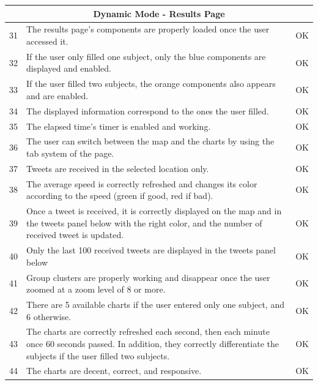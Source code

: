\documentclass[a4paper,11pt]{report}
\begin{document}
\begin{center}
\begin{longtable}{|l|p{10cm}|p{4.4cm}|}
	\multicolumn{3}{|c|}{\textbf{Dynamic Mode - Results Page}}\\\hline	
	31 & The results page's components are properly loaded once the user accessed it. & \color{ForestGreen}OK\color{black}\\\hline
	32 & If the user only filled one subject, only the blue components are displayed and enabled. & \color{ForestGreen}OK\color{black}\\\hline
	33 & If the user filled two subjects, the orange components also appears and are enabled. & \color{ForestGreen}OK\color{black}\\\hline
	34 & The displayed information correspond to the ones the user filled. & \color{ForestGreen}OK\color{black}\\\hline
	35 & The elapsed time's timer is enabled and working. & \color{ForestGreen}OK\color{black}\\\hline
	36 & The user can switch between the map and the charts by using the tab system of the page. & \color{ForestGreen}OK\color{black}\\\hline 
	37 & Tweets are received in the selected location only. & \color{ForestGreen}OK\color{black}\\\hline
	38 & The average speed is correctly refreshed and changes its color according to the speed (green if good, red if bad). & \color{ForestGreen}OK\color{black}\\\hline
	39 & Once a tweet is received, it is correctly displayed on the map and in the tweets panel below with the right color, and the number of received tweet is updated. & \color{ForestGreen}OK\color{black}\\\hline
	40 & Only the last 100 received tweets are displayed in the tweets panel below & \color{ForestGreen}OK\color{black}\\\hline
	41 & Group clusters are properly working and disappear once the user zoomed at a zoom level of 8 or more. & \color{ForestGreen}OK\color{black}\\\hline
	42 & There are 5 available charts if the user entered only one subject, and 6 otherwise. & \color{ForestGreen}OK\color{black}\\\hline
	43 & The charts are correctly refreshed each second, then each minute once 60 seconds passed. In addition, they correctly differentiate the subjects if the user filled two subjects. & \color{ForestGreen}OK\color{black}\\\hline
	44 & The charts are decent, correct, and responsive. & \color{ForestGreen}OK\color{black}\\\hline

\end{longtable}
\end{center}
\end{document}

